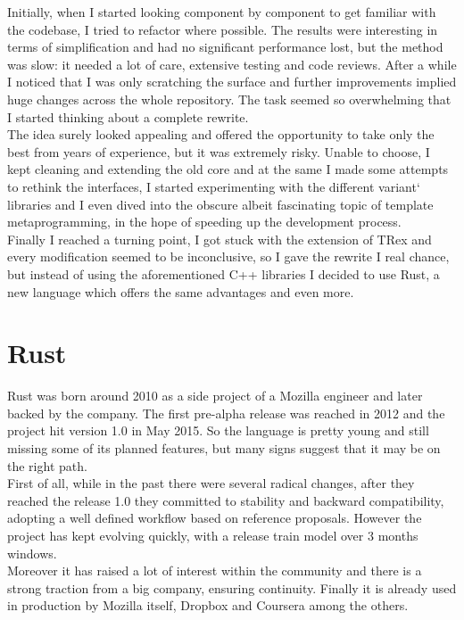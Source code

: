 Initially, when I started looking component by component to get familiar with the codebase, I tried to refactor where possible. The results were interesting in terms of simplification and had no significant performance lost, but the method was slow: it needed a lot of care, extensive testing and code reviews. After a while I noticed that I was only scratching the surface and further improvements implied huge changes across the whole repository. The task seemed so overwhelming that I started thinking about a complete rewrite.\\
The idea surely looked appealing and offered the opportunity to take only the best from years of experience, but it was extremely risky. Unable to choose, I kept cleaning and extending the old core and at the same I made some attempts to rethink the interfaces, I started experimenting with the different variant` libraries and I even dived into the obscure albeit fascinating topic of template metaprogramming, in the hope of speeding up the development process.\\
Finally I reached a turning point, I got stuck with the extension of TRex and every modification seemed to be inconclusive, so I gave the rewrite I real chance, but instead of using the aforementioned C++ libraries I decided to use Rust, a new language which offers the same advantages and even more. 

\section{Rust}
Rust was born around 2010 as a side project of a Mozilla engineer and later backed by the company. The first pre-alpha release was reached in 2012 and the project hit version 1.0 in May 2015. So the language is pretty young and still missing some of its planned features, but many signs suggest that it may be on the right path.\\
First of all, while in the past there were several radical changes, after they reached the release 1.0 they committed to stability and backward compatibility, adopting a well defined workflow based on reference proposals. However the project has kept evolving quickly, with a release train model over 3 months windows.\\
Moreover it has raised a lot of interest within the community and there is a strong traction from a big company, ensuring continuity. Finally it is already used in production by Mozilla itself, Dropbox and Coursera among the others.

